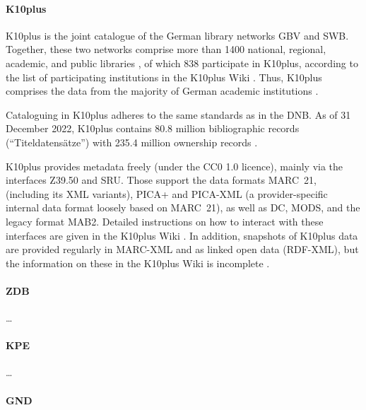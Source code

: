 \paragraph{K10plus}

\gls{K10plus} is the joint catalogue of the German library networks GBV and SWB.
Together, these two networks comprise more than 1400 national, regional,
academic, and public libraries \autocite{BSZGBV,GBV_VZG},
of which 838 participate in K10plus, according to the list of participating institutions
in the K10plus Wiki \autocite{K10plusWiki}. Thus, K10plus comprises the data from
the majority of German academic institutions \autocite[cf.][]{BSZ_K10plus}.

Cataloguing in K10plus adheres to the same standards as in the DNB.
As of 31 December 2022, K10plus contains 80.8 million bibliographic records (\enquote{Titeldatensätze})
with 235.4 million ownership records \autocite{GBV_K10plus_Statistik}.

K10plus provides metadata freely (under the CC0 1.0 licence),
mainly via the interfaces \gls{Z39.50} and \gls{SRU}.
Those support the data formats \gls{MARC}~21, (including its XML variants),
PICA+ and PICA-XML (a provider-specific internal data format loosely based on MARC~21),
as well as \gls{DC}, \gls{MODS}, and the legacy format MAB2.
Detailed instructions on how to interact with these interfaces
are given in the K10plus Wiki \autocite{K10plusWiki}.
In addition, snapshots of K10plus data are provided regularly
in \gls{MARC}-XML and as linked open data (RDF-XML), but the information
on these in the K10plus Wiki is incomplete \autocite{K10plusWikiOD}.






\paragraph{ZDB}

\dots

\paragraph{KPE}

\dots

\paragraph{GND}

